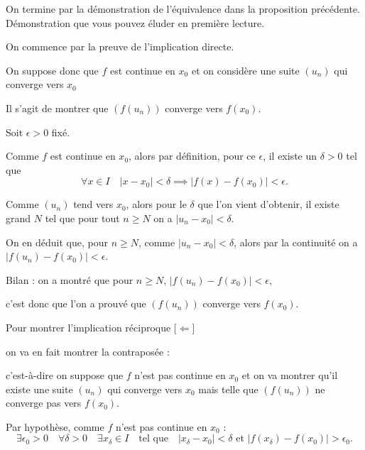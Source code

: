 \diapo

On termine par la démonstration de l'équivalence dans la proposition précédente.
Démonstration que vous pouvez éluder en première lecture.

\change

On commence par la preuve de l'implication directe.

On suppose donc que $f$ est continue en $x_0$
et on considère une suite $(u_n)$ qui 
  converge vers $x_0$
  
 Il s'agit de  montrer que $(f(u_n))$ converge vers $f(x_0)$.

 \change
 

  Soit $\epsilon >0$ fixé. 
 
 \change
 
  Comme $f$ est continue en $x_0$, alors par définition, pour ce $\epsilon$,
  il existe un $\delta>0$ tel que
\[
\forall x \in I \quad  |x-x_0|<\delta \implies |f(x)-f(x_0)|<\epsilon.
\]

\change

Comme $(u_n)$ tend vers $x_0$, 
alors pour le $\delta$ que l'on vient d'obtenir, il existe grand $N$ tel que
pour tout $n\geq N$ on a $|u_n-x_0|<\delta.$

\change


On en déduit que, pour  $n\geq N$, comme $|u_n-x_0|<\delta$, 
alors par la continuité on a $|f(u_n)-f(x_0)|<\epsilon$.

\change

Bilan : on a montré que pour $n\ge N$, $|f(u_n)-f(x_0)|<\epsilon$,

c'est donc que l'on a prouvé que $(f(u_n))$ converge vers $f(x_0)$.


\diapo

\change

Pour montrer l'implication réciproque [$\Leftarrow$]

on va en fait montrer la contraposée : 
  
  c'est-à-dire on suppose que $f$ n'est pas continue en $x_0$ et on va
  montrer qu'il existe   une suite $(u_n)$ qui converge vers $x_0$ mais telle que $(f(u_n))$ ne converge pas 
  vers $f(x_0)$.
  
 \change
 
 
  
  Par hypothèse, comme $f$ n'est pas continue en $x_0$ :
\[
\exists \epsilon_0>0 \quad \forall\delta>0 \quad \exists x_\delta \in I \quad 
\text{tel que} \quad |x_\delta-x_0|<\delta \text{ et } |f(x_\delta)-f(x_0)|>\epsilon_0.
\]


